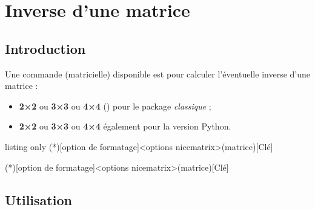 \documentclass[french,a4paper,11pt]{article}
\newcommand\cmaj[1]{\tcbox[vignetteMaJ]{#1}\xspace}
\begin{document}
\section{Inverse d'une matrice}

\subsection{Introduction}

\begin{cautionblock}
Une commande (matricielle) disponible est pour calculer l'éventuelle inverse d'une matrice :

\begin{itemize}
	\item \textbf{2×2} ou \textbf{3×3} ou \textbf{4×4} (\cmaj{0.1.5}) pour le package \textit{classique} ;
	\item \textbf{2×2} ou \textbf{3×3} ou \textbf{4×4} également pour la version \textsf{Python}.
\end{itemize}
\vspace*{-\baselineskip}\leavevmode
\end{cautionblock}

\begin{PresentationCode}{listing only}
\MatriceInverse(*)[option de formatage]<options nicematrix>(matrice)[Clé]

\MatriceInversePY(*)[option de formatage]<options nicematrix>(matrice)[Clé]
\end{PresentationCode}

\subsection{Utilisation}
\end{document}
